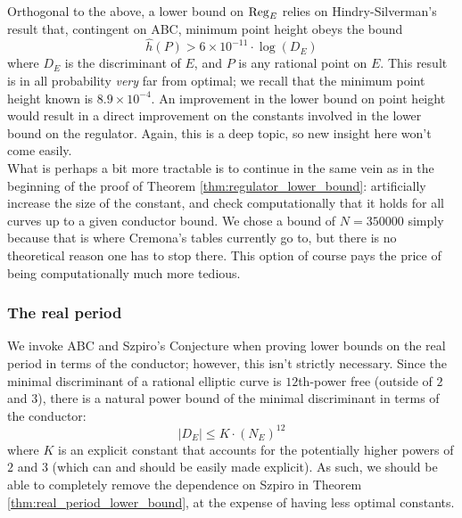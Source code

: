Orthogonal to the above, a lower bound on $\operatorname{Reg}_E$ relies on Hindry-Silverman's \cite{HiS-1988} result that, contingent on ABC, minimum point height obeys the bound
\begin{equation}
\hat{h}(P) > 6\times 10^{-11}\cdot \log(D_E)
\end{equation}
where $D_E$ is the discriminant of $E$, and $P$ is any rational point on $E$. This result is in all probability {\it very} far from optimal; we recall that the minimum point height known is $8.9\times 10^{-4}$. An improvement in the lower bound on point height would result in a direct improvement on the constants involved in the lower bound on the regulator. Again, this is a deep topic, so new insight here won't come easily. \\

What is perhaps a bit more tractable is to continue in the same vein as in the beginning of the proof of Theorem \ref{thm:regulator_lower_bound}: artificially increase the size of the constant, and check computationally that it holds for all curves up to a given conductor bound. We chose a bound of $N=350000$ simply because that is where Cremona's tables currently go to, but there is no theoretical reason one has to stop there. This option of course pays the price of being computationally much more tedious. \\

\subsubsection{The real period}

We invoke ABC and Szpiro's Conjecture when proving lower bounds on the real period in terms of the conductor; however, this isn't strictly necessary. Since the minimal discriminant of a rational elliptic curve is $12$th-power free (outside of $2$ and $3$), there is a natural power bound of the minimal discriminant in terms of the conductor:
\begin{equation}
|D_E| \le K\cdot \left(N_E\right)^{12}
\end{equation}
where $K$ is an explicit constant that accounts for the potentially higher powers of $2$ and $3$ (which can and should be easily made explicit). As such, we should be able to completely remove the dependence on Szpiro in Theorem \ref{thm:real_period_lower_bound}, at the expense of having less optimal constants. \\

